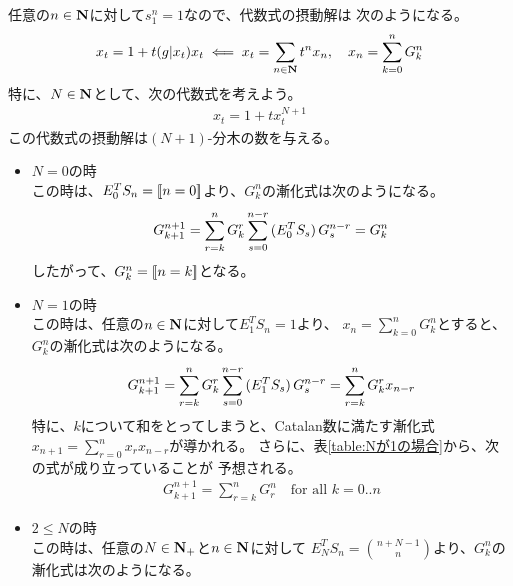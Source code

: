 {	任意の$n\in\mathbf{N}$に対して$s^n_1=1$なので、代数式の摂動解は
	次のようになる。
	\begin{equation*}\begin{split}
		x_t = 1 + t(g|x_t)x_t \impliedby x_t = \sum_{n\in\mathbf{N}}t^n x_n,\quad
		x_n = \sum_{k=0}^n G^n_k
	\end{split}\end{equation*}
	特に、$N\in\mathbf{N}$として、次の代数式を考えよう。
	\begin{equation*}\begin{split}
		x_t = 1 + tx_t^{N+1}
	\end{split}\end{equation*}
	この代数式の摂動解は$(N+1)$-分木の数を与える。
	\begin{itemize}\setlength{\itemsep}{-1mm} %
		\item $N=0$の時 \\
		この時は、$E_0^TS_n=\mathinner{[\![n=0]\!]}$より、$G^n_k$の漸化式は次のようになる。
		\begin{equation*}\begin{split}
			G^{n+1}_{k+1} 
			= \sum_{r=k}^n G^r_k \sum_{s=0}^{n-r} \mathinner{({E_0^TS_s})}G^{n-r}_s
			= G^n_k
		\end{split}\end{equation*}
		したがって、$G^n_k=\mathinner{[\![n=k]\!]}$となる。
		\item $N=1$の時 \\
		この時は、任意の$n\in\mathbf{N}$に対して$E_1^TS_n=1$より、
		$x_n=\sum_{k=0}^nG^n_k$とすると、$G^n_k$の漸化式は次のようになる。
		\begin{equation*}\begin{split}
			G^{n+1}_{k+1} 
			= \sum_{r=k}^n G^r_k \sum_{s=0}^{n-r} \mathinner{({E_1^TS_s})}G^{n-r}_s
			= \sum_{r=k}^n G^r_k x_{n-r}
		\end{split}\end{equation*}
		特に、$k$について和をとってしまうと、Catalan数に満たす漸化式
		$x_{n+1} = \sum_{r=0}^n x_rx_{n-r}$が導かれる。
		さらに、表\ref{table:Nが1の場合}から、次の式が成り立っていることが
		予想される。
		\begin{equation*}\begin{split}
			G^{n+1}_{k+1} = \sum_{r=k}^n G^n_r \quad\text{for all } k=0..n
		\end{split}\end{equation*}
		\item $2\le N$の時 \\
		この時は、任意の$N\in\mathbf{N}_+$と$n\in\mathbf{N}$に対して
		$E_N^TS_n=\binom{n+N-1}{n}$より、$G^n_k$の漸化式は次のようになる。

\end{itemize}}
